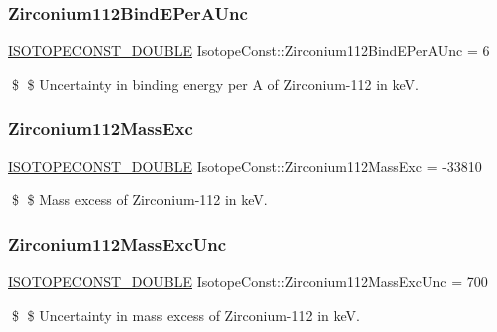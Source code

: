 \subsubsection{\texorpdfstring{Zirconium112\+Bind\+E\+Per\+A\+Unc}{Zirconium112BindEPerAUnc}}
{\footnotesize\ttfamily \mbox{\hyperlink{group___isotope_const-_macros_ga8f45a7272ce02c0b4c65c44636ed719a}{I\+S\+O\+T\+O\+P\+E\+C\+O\+N\+S\+T\+\_\+\+D\+O\+U\+B\+LE}} Isotope\+Const\+::\+Zirconium112\+Bind\+E\+Per\+A\+Unc = 6}

\$ \$ Uncertainty in binding energy per A of Zirconium-\/112 in keV. \mbox{\label{group___isotope_const-_zirconium-_zr112_ga89af8ec8f2d17b0e07229762179a338f}} 
\subsubsection{\texorpdfstring{Zirconium112\+Mass\+Exc}{Zirconium112MassExc}}
{\footnotesize\ttfamily \mbox{\hyperlink{group___isotope_const-_macros_ga8f45a7272ce02c0b4c65c44636ed719a}{I\+S\+O\+T\+O\+P\+E\+C\+O\+N\+S\+T\+\_\+\+D\+O\+U\+B\+LE}} Isotope\+Const\+::\+Zirconium112\+Mass\+Exc = -\/33810}

\$ \$ Mass excess of Zirconium-\/112 in keV. \mbox{\label{group___isotope_const-_zirconium-_zr112_ga5d879643a835e2233ec8a5bf19625bb5}} 
\subsubsection{\texorpdfstring{Zirconium112\+Mass\+Exc\+Unc}{Zirconium112MassExcUnc}}
{\footnotesize\ttfamily \mbox{\hyperlink{group___isotope_const-_macros_ga8f45a7272ce02c0b4c65c44636ed719a}{I\+S\+O\+T\+O\+P\+E\+C\+O\+N\+S\+T\+\_\+\+D\+O\+U\+B\+LE}} Isotope\+Const\+::\+Zirconium112\+Mass\+Exc\+Unc = 700}

\$ \$ Uncertainty in mass excess of Zirconium-\/112 in keV. \mbox{\label{group___isotope_const-_zirconium-_zr112_gabb1ec873ef3639c701d2ccb3e5476957}} 
